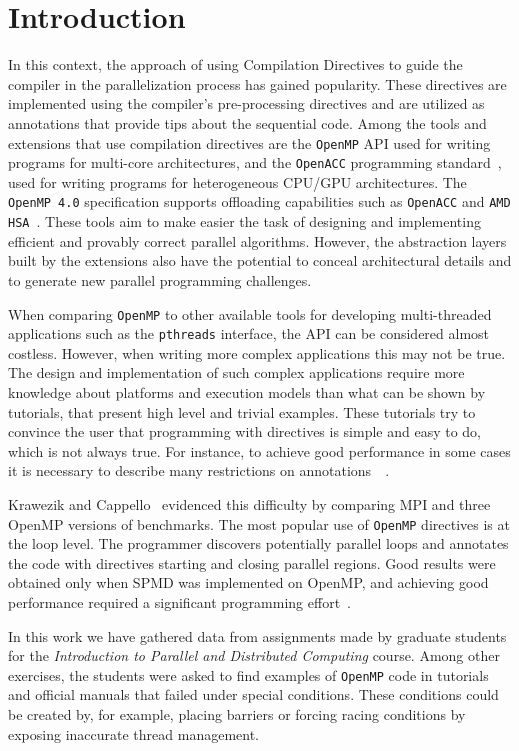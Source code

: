 \section{Introduction}
\label{sec:introduction}


In this context, the approach of using Compilation Directives to guide the
compiler in the parallelization process has gained popularity. These directives
are implemented using the compiler's pre-processing directives and are utilized
as annotations that provide tips about the sequential code. Among the tools and
extensions that use compilation directives are the \texttt{OpenMP} API
\cite{Dagum1998a} \cite{Chapman:2007} used for writing programs for multi-core
architectures, and the \texttt{OpenACC} programming
standard~\cite{openacc:api}, used for writing programs for heterogeneous
CPU/GPU architectures. The \texttt{OpenMP 4.0} specification supports
offloading capabilities \cite{openmp:api:2013} such as \texttt{OpenACC} and
\texttt{AMD HSA}~\cite{amd:hsa:site}. These tools aim to make easier the task
of designing and implementing efficient and provably correct parallel
algorithms. However, the abstraction layers built by the extensions also have
the potential to conceal architectural details and to generate new parallel
programming challenges.

When comparing \texttt{OpenMP} to other available tools for developing
multi-threaded applications such as the \texttt{pthreads} interface, the API
can be considered almost costless. However, when writing more complex
applications this may not be true. The design and implementation of such
complex applications require more knowledge about platforms and execution
models than what can be shown by tutorials, that present high level and trivial
examples. These tutorials try to convince the user that programming with
directives is simple and easy to do, which is not always true. For instance, to
achieve good performance in some cases it is necessary to describe many
restrictions on annotations~\cite{OpenMPTasks2009}~\cite{mattson2003good}.

Krawezik and Cappello~\cite{CPE:CPE905} evidenced this difficulty by comparing
MPI and three OpenMP versions of benchmarks. The most popular use of
\texttt{OpenMP} directives is at the loop level. The programmer discovers
potentially parallel loops and annotates the code with directives starting and
closing parallel regions. Good results were obtained only when SPMD was
implemented on OpenMP, and achieving good performance required a significant
programming effort~\cite{CPE:CPE905}.

In this work we have gathered data from assignments made by graduate students
for the \emph{Introduction to Parallel and Distributed Computing} course. Among
other exercises, the students were asked to find examples of \texttt{OpenMP}
code in tutorials and official manuals that failed under special conditions.
These conditions could be created by, for example, placing barriers or forcing
racing conditions by exposing inaccurate thread management.

